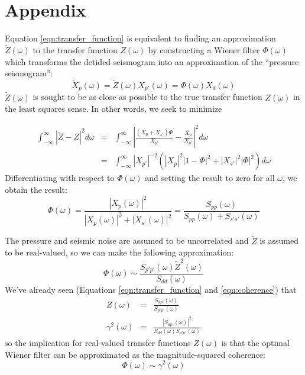 \section{Appendix}
Equation \ref{eqn:transfer_function} is equivalent to finding an approximation  $\widetilde{Z} (\omega)$ to the transfer function $Z (\omega)$ by constructing a Wiener filter $\Phi (\omega)$ which transforms the detided seismogram into an approximation of the ``pressure seismogram'':
\begin{equation}
  \widetilde{X}_{p}  (\omega) = \widetilde{Z} (\omega) X_{p'} (\omega) = \Phi (\omega) X_d  (\omega)
\end{equation}
\noindent $\widetilde{Z} (\omega)$ is sought to be as close as possible to the true transfer function $Z (\omega)$ in the least squares sense. In other words, we seek to minimize

\begin{eqnarray}
  \int_{-\infty}^{\infty} \left| \widetilde{Z} - Z \right| ^2 d\omega &=& \int_{-\infty}^{\infty} \left| \frac{ \left(X_{p} + X_{s'}\right) \Phi}{X_{p'}} - \frac{X_{p}}{X_{p'}} \right|^2 d\omega \\
  &=& \int_{-\infty}^{\infty} \left| X_{p'} \right|^{-2} \left( \left| X_{p} \right|^2 \left| 1 - \Phi \right |^2 + \left| X_{s'} \right|^2 \left| \Phi \right|^2 \right) d\omega
\end{eqnarray}
\noindent Differentiating with respect to $\Phi (\omega)$ and setting the result to zero for all $\omega$, we obtain the result:
\begin{equation}
  \Phi (\omega)= \frac{\left| X_p (\omega) \right|^2}{ \left| X_p (\omega) \right|^2 + \left| X_{s'} (\omega) \right|^2 } = \frac{S_{pp} (\omega)}{S_{pp} (\omega) + S_{s's'} (\omega)}
\end{equation}

\noindent The pressure and seismic noise are assumed to be uncorrelated and $\widetilde{Z}$ is assumed to be real-valued, so we can make the following approximation:
\begin{equation}
  \Phi (\omega) \sim \frac{ S_{p'p'} (\omega) \widetilde{Z}^2 (\omega)}{S_{dd} (\omega)}
  \label{eqn:approx_filter}
\end{equation}
\noindent We've already seen (Equations \ref{eqn:transfer_function} and \ref{eqn:coherence}) that
\begin{eqnarray}
  Z(\omega) &=& \frac{S_{dp'} (\omega)}{S_{p'p'} (\omega)} \\
  \gamma^2 (\omega) &=& \frac{ \left| S_{dp'} (\omega) \right|^2}{S_{dd} (\omega)S_{p'p'} (\omega)}
\end{eqnarray}
\noindent so the implication for real-valued transfer functions $Z (\omega)$ is that the optimal Wiener filter can be approximated as the magnitude-squared coherence:
\begin{equation}
  \Phi (\omega) \sim \gamma^2 (\omega)
  \label{eqn:optimal_filter}
\end{equation}



